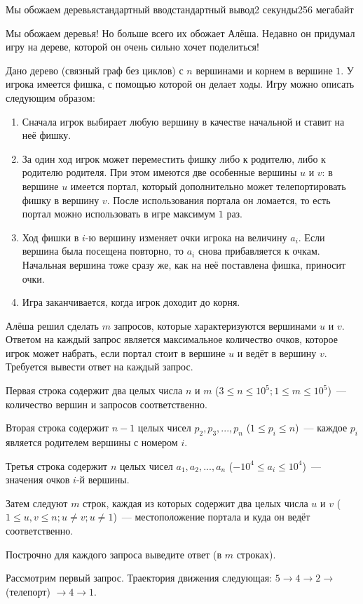 \begin{problem}{Мы обожаем деревья}{стандартный ввод}{стандартный вывод}{2 секунды}{256 мегабайт}

Мы обожаем деревья! Но больше всего их обожает Алёша. Недавно он придумал игру на дереве, которой он очень сильно хочет поделиться!

Дано дерево (связный граф без циклов) с $n$ вершинами и корнем в вершине $1$. У игрока имеется фишка, с помощью которой он делает ходы. Игру можно описать следующим образом:

\begin{enumerate}
\item Сначала игрок выбирает любую вершину в качестве начальной и ставит на неё фишку.
\item За один ход игрок может переместить фишку либо к родителю, либо к родителю родителя. При этом имеются две особенные вершины $u$ и $v$: в вершине $u$ имеется портал, который дополнительно может телепортировать фишку в вершину $v$. После использования портала он ломается, то есть портал можно использовать в игре максимум $1$ раз.
\item Ход фишки в $i$-ю вершину изменяет очки игрока на величину $a_i$. Если вершина была посещена повторно, то $a_i$ снова прибавляется к очкам. Начальная вершина тоже сразу же, как на неё поставлена фишка, приносит очки.
\item Игра заканчивается, когда игрок доходит до корня.
\end{enumerate}

Алёша решил сделать $m$ запросов, которые характеризуются вершинами $u$ и $v$. Ответом на каждый запрос является максимальное количество очков, которое игрок может набрать, если портал стоит в вершине $u$ и ведёт в вершину $v$. Требуется вывести ответ на каждый запрос.

\InputFile
Первая строка содержит два целых числа $n$ и $m$ ($3 \leq n \leq 10^5; 1 \leq m \leq 10^5$)~--- количество вершин и запросов соответственно.

Вторая строка содержит $n-1$ целых чисел $p_2,p_3,...,p_n$ ($1 \leq p_i \leq n$)~--- каждое $p_i$ является родителем вершины с номером $i$.

Третья строка содержит $n$ целых чисел $a_1,a_2,...,a_n$ ($-10^4 \leq a_i \leq 10^4$)~--- значения очков $i$-й вершины.

Затем следуют $m$ строк, каждая из которых содержит два целых числа $u$ и $v$ ($1 \leq u,v \leq n; u \neq v; u \neq 1$)~--- местоположение портала и куда он ведёт соответственно.

\OutputFile
Построчно для каждого запроса выведите ответ (в $m$ строках).

\Example

\begin{example}
%
\end{example}

\Note
Рассмотрим первый запрос. Траектория движения следующая: $5 \rightarrow 4 \rightarrow 2 \rightarrow$ (телепорт) $\rightarrow 4 \rightarrow 1$.

\end{problem}


